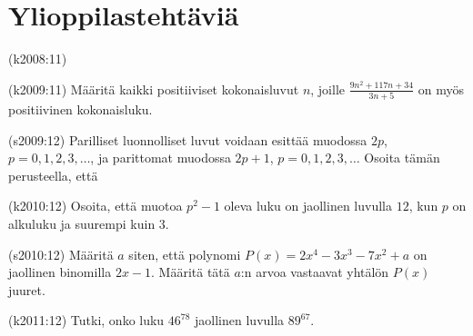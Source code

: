 \chapter{Ylioppilastehtäviä}

\begin{tehtava}
(k2008:11)
\begin{vastaus}
\end{vastaus}
\end{tehtava}


\begin{tehtava}
(k2009:11) Määritä kaikki positiiviset kokonaisluvut $n$, joille $\frac{9n^2+117n+34}{3n+5}$ on myös positiivinen kokonaisluku. 
\begin{vastaus}
\end{vastaus}
\end{tehtava}


\begin{tehtava}
(s2009:12) Parilliset luonnolliset luvut voidaan esittää muodossa $2p$, $p=0,1,2,3,\ldots$, ja parittomat muodossa $2p+1$, $p=0,1,2,3,\ldots$ Osoita tämän perusteella, että
\begin{vastaus}
\end{vastaus}
\end{tehtava}


\begin{tehtava}
(k2010:12) Osoita, että muotoa $p^2-1$ oleva luku on jaollinen luvulla $12$, kun $p$ on alkuluku ja suurempi kuin $3$. 
\begin{vastaus}
\end{vastaus}
\end{tehtava}

\begin{tehtava}
(s2010:12) Määritä $a$ siten, että polynomi $P(x)=2x^4-3x^3-7x^2+a$ on jaollinen binomilla $2x-1$. Määritä tätä $a$:n arvoa vastaavat yhtälön $P(x)$ juuret. 
\begin{vastaus}
\end{vastaus}
\end{tehtava}


\begin{tehtava}
(k2011:12) Tutki, onko luku $46^{78}$ jaollinen luvulla $89^{67}$.
\begin{vastaus}
\end{vastaus}
\end{tehtava}


